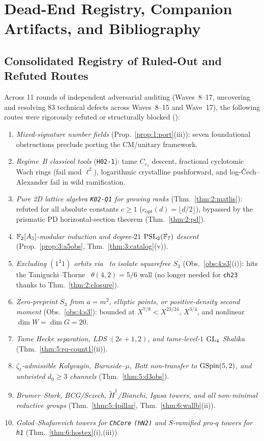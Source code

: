 \section{Dead-End Registry, Companion Artifacts, and Bibliography}\label{sec:7:end}

\subsection{Consolidated Registry of Ruled-Out and Refuted Routes}\label{sec:7:dead}

Across 11 rounds of independent adversarial auditing (Waves~8--17, uncovering and resolving $83$ technical defects across Waves~8--15 and Wave~17), the following routes were rigorously refuted or structurally blocked (\tagObs{}):
\begin{enumerate}[label=\textup{(\arabic*)}]
\item \emph{Mixed-signature number fields} (Prop.~\ref{prop:1:port}(iii)): seven foundational obstructions preclude porting the CM/unitary framework.
\item \emph{Regime~B classical tools} (\texttt{H02-1}): tame $C_{e_1}$ descent, fractional cyclotomic Wach rings (fail mod $\ell^2$), logarithmic crystalline pushforward, and log-\v{C}ech--Alexander fail in wild ramification.
\item \emph{Pure 2D lattice algebra \texttt{K02-Q1} for growing ranks} (Thm.~\ref{thm:2:matlis}): refuted for all absolute constants $c \ge 1$ ($c_{\mathrm{opt}}(d) = \lfloor d/2 \rfloor$), bypassed by the prismatic PD horizontal-section theorem (Thm.~\ref{thm:2:pd}).
\item \emph{$\mathbb{F}_2[A_5]$-modular induction and degree-$21$ $\mathrm{PSL}_2(\mathbb{F}_7)$ descent} (Prop.~\ref{prop:3:a5obs}, Thm.~\ref{thm:3:catalog}(v)).
\item \emph{Excluding $(1^3 1)$ orbits via~\cite{ST2025a,ST2025b} to isolate squarefree $S_3$} (Obs.~\ref{obs:4:s3}(i)): hits the Taniguchi--Thorne~\cite{TT2020} $\theta(4,2)=5/6$ wall (no longer needed for \texttt{ch23} thanks to Thm.~\ref{thm:2:closure}).
\item \emph{Zero-preprint $S_3$ from $a=m^2$, elliptic points, or positive-density second moment} (Obs.~\ref{obs:4:s3}): bounded at $X^{7/8} < X^{23/24}$, $X^{3/4}$, and nonlinear $\dim W = \dim G = 20$.
\item \emph{Tame Hecke separation, LDS $(2e+1,2)$, and tame-level-$1$ $\mathrm{GL}_4$ Shalika} (Thm.~\ref{thm:5:rq-count1}(ii)).
\item \emph{$\zeta_\ell$-admissible Kolyvagin, Burnside--$\mu$, Bott non-transfer to $\mathrm{GSpin}(5,2)$, and untwisted $d_0 \ge 3$ channels} (Thm.~\ref{thm:5:d3obs}).
\item \emph{Brumer--Stark, BCG/Sczech, $\widetilde{H}^1$/Bianchi, Igusa towers, and all non-minimal reductive groups} (Thm.~\ref{thm:5:4pillar}, Thm.~\ref{thm:6:wallb}(ii)).
\item \emph{Golod--Shafarevich towers for \texttt{ChCore} \texttt{(hN2)} and $S$-ramified pro-$q$ towers for \texttt{h1}} (Thm.~\ref{thm:6:hostex}(i),(iii)).
\end{enumerate}

